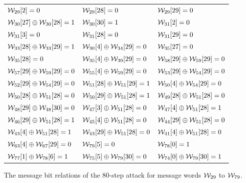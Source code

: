 \begin{figure}[!htb]
\centering
  \begin{tabular}{l l l}
$\mathcal{W}_{29}[2] = 0$ & $\mathcal{W}_{29}[28] = 0$ & $\mathcal{W}_{29}[29] = 0$ \\
$\mathcal{W}_{30}[27] \oplus \mathcal{W}_{30}[28] = 1$ & $\mathcal{W}_{30}[30] = 1$ & $\mathcal{W}_{31}[2] = 0$ \\
$\mathcal{W}_{31}[3] = 0$ & $\mathcal{W}_{31}[28] = 0$ & $\mathcal{W}_{31}[29] = 0$ \\
$\mathcal{W}_{33}[28] \oplus \mathcal{W}_{33}[29] = 1$ & $\mathcal{W}_{30}[4] \oplus \mathcal{W}_{34}[29] = 0$ & $\mathcal{W}_{35}[27] = 0$ \\
$\mathcal{W}_{35}[28] = 0$ & $\mathcal{W}_{35}[4]  \oplus \mathcal{W}_{39}[29] = 0$ & $\mathcal{W}_{58}[29] \oplus \mathcal{W}_{59}[29] = 0$ \\
$\mathcal{W}_{57}[29] \oplus \mathcal{W}_{59}[29] = 0$ & $\mathcal{W}_{55}[4]  \oplus \mathcal{W}_{59}[29] = 0$ & $\mathcal{W}_{53}[29] \oplus \mathcal{W}_{54}[29] = 0$ \\ 
$\mathcal{W}_{52}[29] \oplus \mathcal{W}_{54}[29] = 0$ & $\mathcal{W}_{51}[28] \oplus \mathcal{W}_{51}[29] = 1$ & $\mathcal{W}_{50}[4]  \oplus \mathcal{W}_{54}[29] = 0$ \\ 
$\mathcal{W}_{50}[28] \oplus \mathcal{W}_{51}[28] = 0$ & $\mathcal{W}_{50}[29] \oplus \mathcal{W}_{51}[28] = 1$ & $\mathcal{W}_{49}[28] \oplus \mathcal{W}_{51}[28] = 0$ \\ 
$\mathcal{W}_{48}[29] \oplus \mathcal{W}_{48}[30] = 0$ & $\mathcal{W}_{47}[3]  \oplus \mathcal{W}_{51}[28] = 0$ & $\mathcal{W}_{47}[4]  \oplus \mathcal{W}_{51}[28] = 1$ \\ 
$\mathcal{W}_{46}[29] \oplus \mathcal{W}_{51}[28] = 1$ & $\mathcal{W}_{45}[4]  \oplus \mathcal{W}_{51}[28] = 0$ & $\mathcal{W}_{44}[29] \oplus \mathcal{W}_{51}[28] = 0$ \\ 
$\mathcal{W}_{43}[4]  \oplus \mathcal{W}_{51}[28] = 1$ & $\mathcal{W}_{43}[29] \oplus \mathcal{W}_{51}[28] = 0$ & $\mathcal{W}_{41}[4]  \oplus \mathcal{W}_{51}[28] = 0$ \\ 
$\mathcal{W}_{63}[4]  \oplus \mathcal{W}_{67}[29] = 0$ & $\mathcal{W}_{79}[5] = 0$ & $\mathcal{W}_{78}[0] = 1$ \\
$\mathcal{W}_{77}[1] \oplus \mathcal{W}_{78}[6] = 1$ & $\mathcal{W}_{75}[5] \oplus \mathcal{W}_{79}[30] = 0$ & $\mathcal{W}_{74}[0] \oplus \mathcal{W}_{79}[30] = 1$ \\
  \end{tabular}
  \caption{The message bit relations of the 80-step attack for message words $\mathcal{W}_{29}$ to $\mathcal{W}_{79}$.
  \label{fig:msgbitrel80}}
\end{figure}

